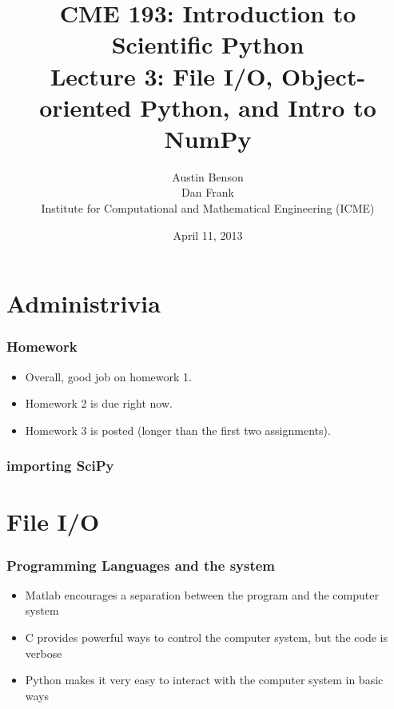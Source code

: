 \documentclass{beamer}
\title{CME 193: Introduction to Scientific Python \\
Lecture 3: File I/O, Object-oriented Python, and Intro to NumPy}
\author{Austin Benson \\
\vspace{0.1in}
Dan Frank \\
\vspace{0.1in}
Institute for Computational and Mathematical Engineering (ICME)}
\date{April 11, 2013}
\begin{document}
\maketitle

\section{Administrivia}
\begin{frame}
\frametitle{Homework}
\begin{itemize}
\setlength{\itemsep}{0.1in}
\item{Overall, good job on homework 1.}
\item{Homework 2 is due right now.}
\item{Homework 3 is posted (longer than the first two assignments).}
\end{itemize}
\end{frame}

\begin{frame}
\frametitle{importing SciPy}


\end{frame}





\section{File I/O}
\begin{frame}
\frametitle{Programming Languages and the system}
\begin{itemize}
\setlength{\itemsep}{0.1in}
\item{Matlab encourages a separation between the program and the computer system}
\item{C provides powerful ways to control the computer system, but the code is verbose}
\item{Python makes it very easy to interact with the computer system in basic ways}
\end{itemize}
\end{frame}
\end{document}

